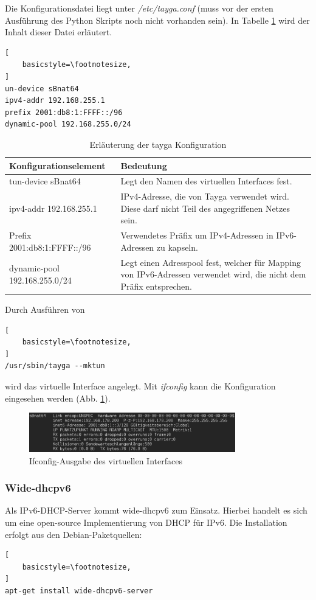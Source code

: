 Die Konfigurationsdatei liegt unter \textit{/etc/tayga.conf} (muss vor der ersten Ausführung des Python Skripts noch nicht vorhanden sein). In Tabelle \ref{tab:taygaConfig} wird der Inhalt dieser Datei erläutert.
\begin{lstlisting}[
	basicstyle=\footnotesize,
]
un-device sBnat64
ipv4-addr 192.168.255.1
prefix 2001:db8:1:FFFF::/96
dynamic-pool 192.168.255.0/24
\end{lstlisting}

\begin{table}
	\centering
		\begin{tabular}{lp{9cm}}
			Konfigurationselement & Bedeutung \\ \hline
			tun-device sBnat64 & Legt den Namen des virtuellen Interfaces fest. \\
			ipv4-addr 192.168.255.1 & IPv4-Adresse, die von Tayga verwendet wird. Diese darf nicht Teil des angegriffenen Netzes sein. \\
			Prefix 2001:db8:1:FFFF::/96 & Verwendetes Präfix um IPv4-Adressen in IPv6-Adressen zu kapseln. \\
			dynamic-pool 192.168.255.0/24 & Legt einen Adresspool fest, welcher für Mapping von IPv6-Adressen verwendet wird, die nicht dem Präfix entsprechen. \\
		\end{tabular}
	\caption{Erläuterung der tayga Konfiguration}
	\label{tab:taygaConfig}
\end{table}

\FloatBarrier

Durch Ausführen von 
\lstset{language=bash}
\begin{lstlisting}[
	basicstyle=\footnotesize,
]
/usr/sbin/tayga --mktun
\end{lstlisting}

wird das virtuelle Interface angelegt. Mit \textit{ifconfig} kann die Konfiguration eingesehen werden (Abb. \ref{fig:tunInterface}). 
\begin{figure}[h!]
	\centering
	\includegraphics[width=0.80\textwidth]{bilder/fakeIPv6/tunInterface.pdf}
	\caption{Ifconfig-Ausgabe des virtuellen Interfaces}
	\label{fig:tunInterface}
\end{figure}


\subsubsection*{Wide-dhcpv6}
Als IPv6-DHCP-Server kommt wide-dhcpv6 zum Einsatz. Hierbei handelt es sich um eine open-source Implementierung von DHCP für IPv6. Die Installation erfolgt aus den Debian-Paketquellen:
\lstset{language=bash}
\begin{lstlisting}[
	basicstyle=\footnotesize,
]
apt-get install wide-dhcpv6-server
\end{lstlisting}

